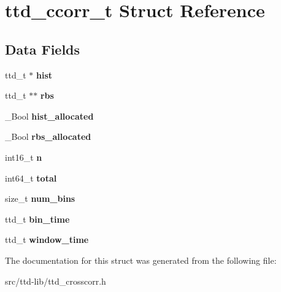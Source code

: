 \hypertarget{structttd__ccorr__t}{}\section{ttd\+\_\+ccorr\+\_\+t Struct Reference}
\label{structttd__ccorr__t}
\subsection*{Data Fields}
\begin{DoxyCompactItemize}
\item 
\hypertarget{structttd__ccorr__t_a3137ebb67e1f69be7b10152c95e6959f}{}ttd\+\_\+t $\ast$ {\bfseries hist}\label{structttd__ccorr__t_a3137ebb67e1f69be7b10152c95e6959f}

\item 
\hypertarget{structttd__ccorr__t_afd72a1a1cf9cba9cdf66b2308d41341b}{}ttd\+\_\+t $\ast$$\ast$ {\bfseries rbs}\label{structttd__ccorr__t_afd72a1a1cf9cba9cdf66b2308d41341b}

\item 
\hypertarget{structttd__ccorr__t_ad8cb24e9db06027c61602ec11ecdbe7f}{}\+\_\+\+Bool {\bfseries hist\+\_\+allocated}\label{structttd__ccorr__t_ad8cb24e9db06027c61602ec11ecdbe7f}

\item 
\hypertarget{structttd__ccorr__t_a204c1b6e5a4bad2df853a47fb347f754}{}\+\_\+\+Bool {\bfseries rbs\+\_\+allocated}\label{structttd__ccorr__t_a204c1b6e5a4bad2df853a47fb347f754}

\item 
\hypertarget{structttd__ccorr__t_a38227dbd5a7018d08df42390bb5fabe4}{}int16\+\_\+t {\bfseries n}\label{structttd__ccorr__t_a38227dbd5a7018d08df42390bb5fabe4}

\item 
\hypertarget{structttd__ccorr__t_a9a4a5240b8cef78d5dca89a737c07346}{}int64\+\_\+t {\bfseries total}\label{structttd__ccorr__t_a9a4a5240b8cef78d5dca89a737c07346}

\item 
\hypertarget{structttd__ccorr__t_a7a740af6457866cc0ee66d8b4a221673}{}size\+\_\+t {\bfseries num\+\_\+bins}\label{structttd__ccorr__t_a7a740af6457866cc0ee66d8b4a221673}

\item 
\hypertarget{structttd__ccorr__t_a95b44b96f651aba6fc5a7c2ec7165636}{}ttd\+\_\+t {\bfseries bin\+\_\+time}\label{structttd__ccorr__t_a95b44b96f651aba6fc5a7c2ec7165636}

\item 
\hypertarget{structttd__ccorr__t_a0e981c7d14d90057a2ff43c826773d9f}{}ttd\+\_\+t {\bfseries window\+\_\+time}\label{structttd__ccorr__t_a0e981c7d14d90057a2ff43c826773d9f}

\end{DoxyCompactItemize}


The documentation for this struct was generated from the following file\+:\begin{DoxyCompactItemize}
\item 
src/ttd-\/lib/ttd\+\_\+crosscorr.\+h\end{DoxyCompactItemize}

